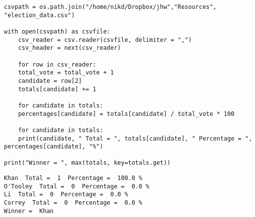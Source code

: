 \documentclass[11pt]{article}
\begin{document}
\begin{verbatim}
csvpath = os.path.join("/home/nikd/Dropbox/jhw","Resources", "election_data.csv")  

with open(csvpath) as csvfile:
    csv_reader = csv.reader(csvfile, delimiter = ",")
    csv_header = next(csv_reader)

    for row in csv_reader:
	total_vote = total_vote + 1
	candidate = row[2]
	totals[candidate] += 1

    for candidate in totals:
	percentages[candidate] = totals[candidate] / total_vote * 100

    for candidate in totals:
	print(candidate, " Total = ", totals[candidate], " Percentage = ", percentages[candidate], "%")

print("Winner = ", max(totals, key=totals.get))
\end{verbatim}

\begin{verbatim}
Khan  Total =  1  Percentage =  100.0 %
O'Tooley  Total =  0  Percentage =  0.0 %
Li  Total =  0  Percentage =  0.0 %
Correy  Total =  0  Percentage =  0.0 %
Winner =  Khan


\end{verbatim}
\end{document}
